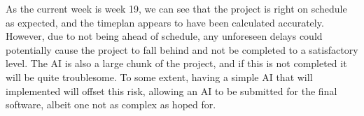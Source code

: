 \vspace{0.3cm}

As the current week is week 19, we can see that the project is right on
schedule as expected, and the timeplan appears to have been calculated
accurately. However, due to not being ahead of schedule, any unforeseen delays
could potentially cause the project to fall behind and not be completed to a
satisfactory level. The AI is also a large chunk of the project, and if this
is not completed it will be quite troublesome. To some extent, having a simple
AI that will implemented will offset this risk, allowing an AI to be submitted
for the final software, albeit one not as complex as hoped for.
